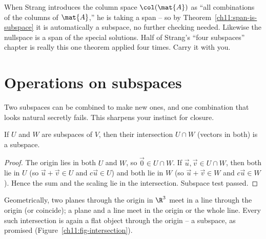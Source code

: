 \begin{strangbox}
When Strang introduces the column space $\col(\mat{A})$ as ``all combinations of the
columns of $\mat{A}$,'' he is taking a span -- so by Theorem~\ref{ch11:span-is-subspace}
it is automatically a subspace, no further checking needed. Likewise the nullspace is a
span of the special solutions. Half of Strang's ``four subspaces'' chapter is really this
one theorem applied four times. Carry it with you.
\end{strangbox}

\section{Operations on subspaces}

Two subspaces can be combined to make new ones, and one combination that looks natural
secretly fails. This sharpens your instinct for closure.

\begin{proposition}\label{ch11:intersection}
If $U$ and $W$ are subspaces of $V$, then their intersection $U\cap W$ (vectors in both)
is a subspace.
\end{proposition}

\begin{proof}
The origin lies in both $U$ and $W$, so $\vec{0}\in U\cap W$. If
$\vec{u},\vec{v}\in U\cap W$, then both lie in $U$ (so $\vec{u}+\vec{v}\in U$ and
$c\vec{u}\in U$) and both lie in $W$ (so $\vec{u}+\vec{v}\in W$ and $c\vec{u}\in W$). Hence
the sum and the scaling lie in the intersection. Subspace test passed.
\end{proof}

Geometrically, two planes through the origin in $\R^3$ meet in a line through the origin
(or coincide); a plane and a line meet in the origin or the whole line. Every such
intersection is again a flat object through the origin -- a subspace, as promised
(Figure~\ref{ch11:fig-intersection}).

